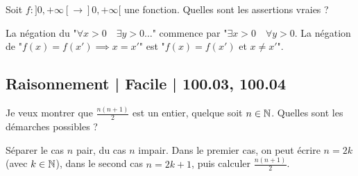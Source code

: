 \begin{question}

Soit $f : ]0,+\infty[ \to ]0,+\infty[$ une fonction.
Quelles sont les assertions vraies ?
\begin{answers}
    
    

\end{answers}
\begin{explanations}
La négation du "$\forall x > 0 \quad \exists y > 0 \ldots$" commence par "$\exists x > 0 \quad \forall y > 0$.
La négation de "$f(x) = f(x') \implies x = x'$" est "$f(x) = f(x')$ et $x \neq x'$".
\end{explanations}
\end{question}



\subsection{Raisonnement | Facile | 100.03, 100.04}


\begin{question}

Je veux montrer que $\frac{n(n+1)}{2}$ est un entier, quelque soit $n\in\mathbb{N}$.  Quelles sont les démarches possibles ?
\begin{answers}    
    


\end{answers}
\begin{explanations}
Séparer le cas $n$ pair, du cas $n$ impair. Dans le premier cas, on peut écrire $n=2k$ (avec $k\in \mathbb{N}$), dans le second cas $n=2k+1$, puis calculer $\frac{n(n+1)}{2}$. 
\end{explanations}
\end{question}


